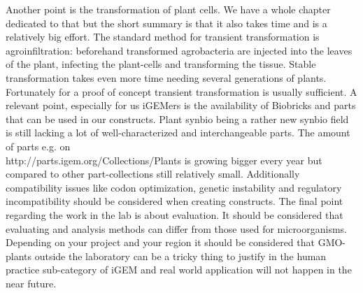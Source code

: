 Another point is the transformation of plant cells. We have a whole chapter dedicated to that but the short summary is that it also takes time and is a relatively big effort. The standard method for transient transformation is agroinfiltration: beforehand transformed agrobacteria are injected into the leaves of the plant, infecting the plant-cells and transforming the tissue. Stable transformation takes even more time needing several generations of plants. Fortunately  for a proof of concept transient transformation is usually sufficient.
\newline\newline
A relevant point, especially for us iGEMers is the availability of Biobricks and parts that can be used in our constructs. Plant synbio being a rather new synbio field is still lacking a lot of well-characterized and interchangeable parts. The amount of parts e.g. on \\ http://parts.igem.org/Collections/Plants is growing bigger every year but compared to other part-collections still relatively small. Additionally compatibility issues like codon optimization, genetic instability and regulatory incompatibility should be considered when creating constructs.
\newline\newline
The final point regarding the work in the lab is about evaluation. It should be considered that evaluating and analysis methods can differ from those used for microorganisms. 
\newline\newline
Depending on your project and your region it should be considered that GMO-plants outside the laboratory can be a tricky thing to justify in the human practice sub-category of iGEM and real world application will not happen in the near future. 


